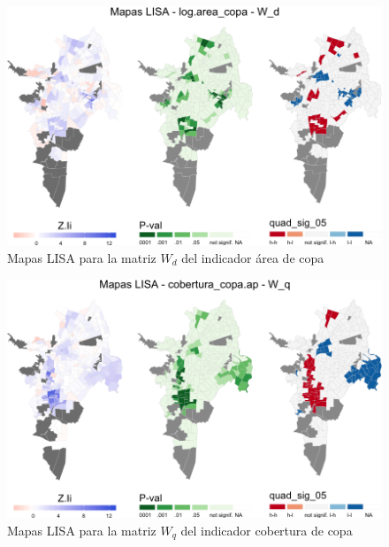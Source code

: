 \documentclass[12pt,a4paper,openany]{book}
\theoremstyle{definition}
\theoremstyle{definition}
\theoremstyle{definition}
\theoremstyle{remark}
\begin{document}
\begin{figure}[H]

{\centering \includegraphics[width=1\linewidth]{tesis-unigis_files/figure-latex/mapas-lisa-copa-wd-1} 

}

\caption{Mapas LISA para la matriz $W_d$ del indicador área de copa}\label{fig:mapas-lisa-copa-wd}
\end{figure}

\begin{figure}[H]

{\centering \includegraphics[width=1\linewidth]{tesis-unigis_files/figure-latex/mapas-lisa-copaap-wq-1} 

}

\caption{Mapas LISA para la matriz $W_q$ del indicador cobertura de copa}\label{fig:mapas-lisa-copaap-wq}
\end{figure}
\end{document}
